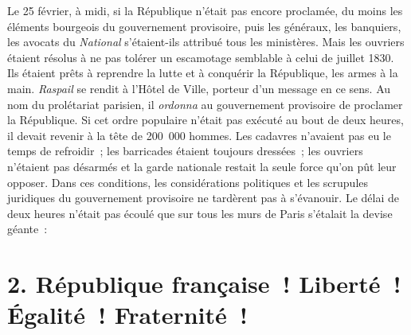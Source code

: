 \documentclass[twoside]{book} %
\begin{document}
Le 25 février, à midi, si la République n’était pas encore proclamée, du moins les éléments bourgeois du gouvernement provisoire, puis les généraux, les banquiers, les avocats du \emph{National} s’étaient-ils attribué tous les ministères. Mais les ouvriers étaient résolus à ne pas tolérer un escamotage semblable à celui de juillet 1830. Ils étaient prêts à reprendre la lutte et à conquérir la République, les armes à la main. \emph{Raspail} se rendit à l’Hôtel de Ville, porteur d’un message en ce sens. Au nom du prolétariat parisien, il \emph{ordonna} au gouvernement provisoire de proclamer la République. Si cet ordre populaire n’était pas exécuté au bout de deux heures, il devait revenir à la tête de 200 000 hommes. Les cadavres n’avaient pas eu le temps de refroidir ; les barricades étaient toujours dressées ; les ouvriers n’étaient pas désarmés et la garde nationale restait la seule force qu’on pût leur opposer. Dans ces conditions, les considérations politiques et les scrupules juridiques du gouvernement provisoire ne tardèrent pas à s’évanouir. Le délai de deux heures n’était pas écoulé que sur tous les murs de Paris s’étalait la devise géante :

\section[{2. République française ! Liberté ! Égalité ! Fraternité !}]{2. République française ! Liberté ! Égalité ! Fraternité !}
\end{document}
